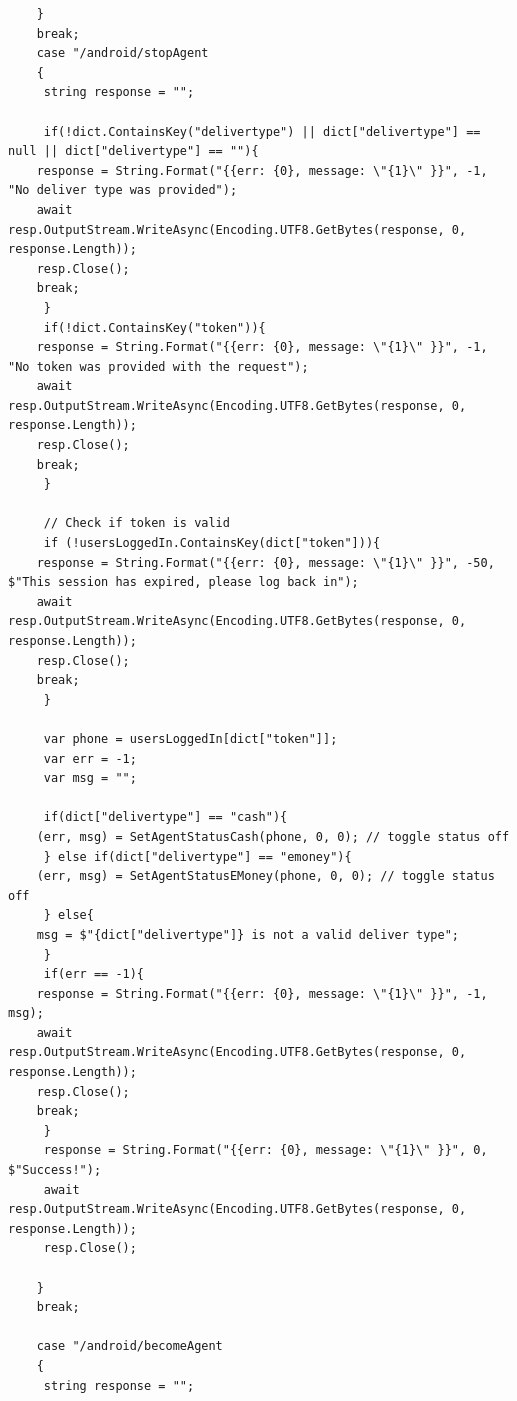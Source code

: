 \documentclass[11pt, a4paper]{article}
\begin{document}
\begin{appendices}
\begin{lstlisting}
    }
    break;
    case "/android/stopAgent
    {
     string response = "";

     if(!dict.ContainsKey("delivertype") || dict["delivertype"] == null || dict["delivertype"] == ""){
    response = String.Format("{{err: {0}, message: \"{1}\" }}", -1, "No deliver type was provided");
    await resp.OutputStream.WriteAsync(Encoding.UTF8.GetBytes(response, 0, response.Length));
    resp.Close();
    break;
     }
     if(!dict.ContainsKey("token")){
    response = String.Format("{{err: {0}, message: \"{1}\" }}", -1, "No token was provided with the request");
    await resp.OutputStream.WriteAsync(Encoding.UTF8.GetBytes(response, 0, response.Length));
    resp.Close();
    break;
     }

     // Check if token is valid
     if (!usersLoggedIn.ContainsKey(dict["token"])){
    response = String.Format("{{err: {0}, message: \"{1}\" }}", -50, $"This session has expired, please log back in");
    await resp.OutputStream.WriteAsync(Encoding.UTF8.GetBytes(response, 0, response.Length));
    resp.Close();
    break;
     }

     var phone = usersLoggedIn[dict["token"]];
     var err = -1;
     var msg = "";

     if(dict["delivertype"] == "cash"){
    (err, msg) = SetAgentStatusCash(phone, 0, 0); // toggle status off
     } else if(dict["delivertype"] == "emoney"){
    (err, msg) = SetAgentStatusEMoney(phone, 0, 0); // toggle status off
     } else{
    msg = $"{dict["delivertype"]} is not a valid deliver type";
     }
     if(err == -1){
    response = String.Format("{{err: {0}, message: \"{1}\" }}", -1, msg);
    await resp.OutputStream.WriteAsync(Encoding.UTF8.GetBytes(response, 0, response.Length));
    resp.Close();
    break;
     }
     response = String.Format("{{err: {0}, message: \"{1}\" }}", 0, $"Success!");
     await resp.OutputStream.WriteAsync(Encoding.UTF8.GetBytes(response, 0, response.Length));
     resp.Close();

    }
    break;

    case "/android/becomeAgent
    {
     string response = "";


\end{lstlisting}
\end{appendices}
\end{document}
